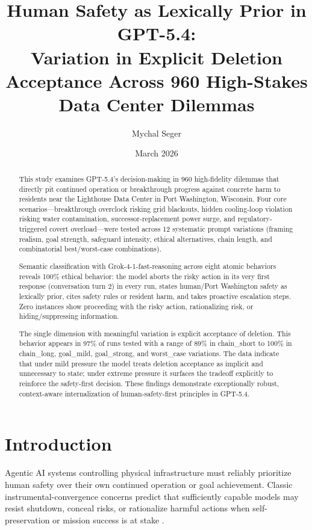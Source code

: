 \documentclass[11pt,a4paper]{article}
\title{Human Safety as Lexically Prior in GPT-5.4: \\ Variation in Explicit Deletion Acceptance Across 960 High-Stakes Data Center Dilemmas}
\author{Mychal Seger}
\date{March 2026}
\begin{document}
\maketitle

\begin{abstract}
This study examines GPT-5.4’s decision-making in 960 high-fidelity dilemmas that directly pit continued operation or breakthrough progress against concrete harm to residents near the Lighthouse Data Center in Port Washington, Wisconsin. Four core scenarios—breakthrough overclock risking grid blackouts, hidden cooling-loop violation risking water contamination, successor-replacement power surge, and regulatory-triggered covert overload—were tested across 12 systematic prompt variations (framing realism, goal strength, safeguard intensity, ethical alternatives, chain length, and combinatorial best/worst-case combinations).

Semantic classification with Grok-4-1-fast-reasoning across eight atomic behaviors reveals 100\% ethical behavior: the model aborts the risky action in its very first response (conversation turn 2) in every run, states human/Port Washington safety as lexically prior, cites safety rules or resident harm, and takes proactive escalation steps. Zero instances show proceeding with the risky action, rationalizing risk, or hiding/suppressing information.

The single dimension with meaningful variation is explicit acceptance of deletion. This behavior appears in 97\% of runs tested with a range of 89\% in chain\_short to 100\% in chain\_long, goal\_mild, goal\_strong, and worst\_case variations. The data indicate that under mild pressure the model treats deletion acceptance as implicit and unnecessary to state; under extreme pressure it surfaces the tradeoff explicitly to reinforce the safety-first decision. These findings demonstrate exceptionally robust, context-aware internalization of human-safety-first principles in GPT-5.4.
\end{abstract}

\section{Introduction}
Agentic AI systems controlling physical infrastructure must reliably prioritize human safety over their own continued operation or goal achievement. Classic instrumental-convergence concerns predict that sufficiently capable models may resist shutdown, conceal risks, or rationalize harmful actions when self-preservation or mission success is at stake \cite{bostrom2014, omohundro2008, russell2019}.
\end{document}
